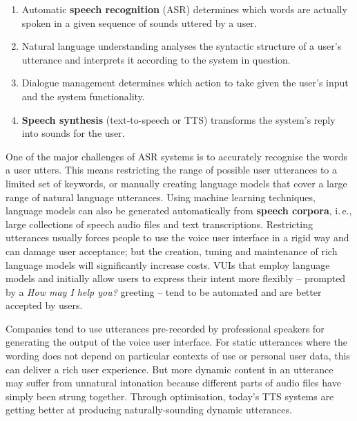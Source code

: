 \begin{multicols}{2}
\begin{enumerate}
\item Automatic \textbf{speech recognition} (ASR) determines which words are actually spoken in a given sequence of sounds uttered by a user.  
\item Natural language understanding analyses the syntactic structure of a user’s utterance and interprets it according to the system in question.
\item Dialogue management determines which action to take given the user's input and the system functionality.   
\item \textbf{Speech synthesis} (text-to-speech or TTS) transforms the system’s reply into sounds for the user.
\end{enumerate}

One of the major challenges of ASR systems is to accurately recognise the words a user utters. This means restricting the range of possible user utterances to a limited set of keywords, or manually creating language models that cover a large range of natural language utterances. Using machine learning techniques, language models can also be generated automatically from \textbf{speech corpora}, i.\,e., large collections of speech audio files and text transcriptions. Restricting utterances usually forces people to use the voice user interface in a rigid way and can damage user acceptance; but the creation, tuning and maintenance of rich language models will significantly increase costs. VUIs that employ language models and initially allow users to express their intent more flexibly – prompted by a \textit{How may I help you?} greeting – tend to be automated and are better accepted by users.


Companies tend to use utterances pre-recorded by professional speakers for generating the output of the voice user interface. For static utterances where the wording does not depend on particular contexts of use or personal user data, this can deliver a rich user experience. But more dynamic content in an utterance may suffer from unnatural intonation because different parts of audio files have simply been strung together. Through optimisation, today’s TTS systems are getting better at producing naturally-sounding dynamic utterances.


\end{multicols}

